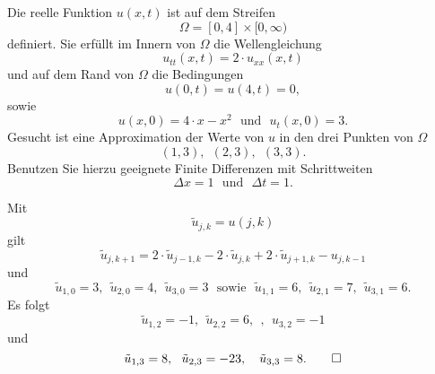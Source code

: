 Die reelle Funktion $u(x,t)$ ist auf dem Streifen
\[
\Omega = [0, 4] \times [0,\infty)
\]
definiert.
Sie erfüllt im Innern von $\Omega$ die Wellengleichung
\[
u_{tt}(x,t) = 2 \cdot u_{xx}(x,t)
\]
und auf dem Rand von $\Omega$ die Bedingungen
\[
u(0,t) = u(4,t) = 0,
\]
sowie
\[
u(x,0) = 4 \cdot x - x^2 \ \ \ \text{und} \ \ \ u_t(x,0) = 3.
\]
Gesucht ist eine Approximation der Werte von $u$ in den drei Punkten von
$\Omega$
\[
(1, 3), \ \  (2, 3), \ \ (3,3).
\]
Benutzen Sie hierzu geeignete Finite Differenzen mit Schrittweiten
\[
\Delta x = 1 \ \ \  \text{und} \ \  \ \Delta t = 1.
\]

\begin{loesung}
Mit
\[
\tilde u_{j,k} = u(j, k)
\]
gilt
\[
\tilde u_{j, k+1}
=
2 \cdot \tilde u_{j-1, k} - 2 \cdot \tilde u_{j, k}
+ 2 \cdot \tilde u_{j+1, k} - u_{j, k-1}
\]
und
\[
\tilde u_{1,0} = 3,
\ \ \tilde u_{2,0} = 4,
\ \ \tilde u_{3,0} = 3
\ \ \ \text{sowie}
\ \ \ \tilde u_{1,1} = 6,
\ \ \tilde u_{2,1} = 7,
\ \ \tilde u_{3,1} = 6.
\]
Es folgt
\[
\tilde u_{1,2} = -1, \ \ \tilde u_{2,2} = 6, \ \ , \ \ u_{3,2} = -1
\]
und
\[
\tilde u_{1,3} = 8, \ \  \tilde u_{2,3} = -23, \ \ \ \tilde u_{3,3} = 8.
\qedhere
\]
\end{loesung}




